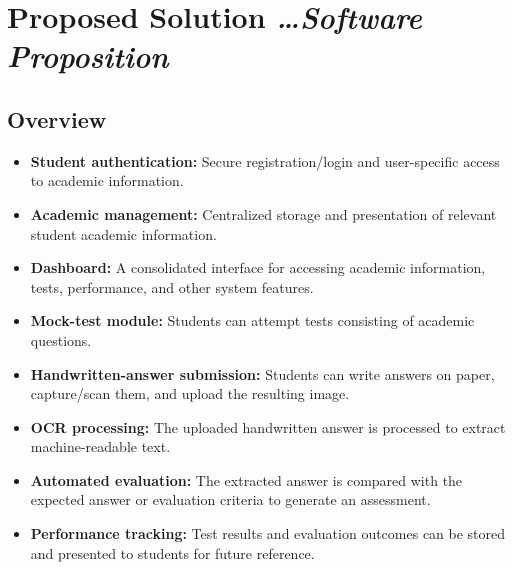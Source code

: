 \documentclass[11pt,a4paper]{article}
\newcommand{\BvrHint}[1]{%
  {\normalfont\normalsize\itshape\hfill #1}}
\begin{document}
\section{Proposed Solution %
\BvrHint{\ldots Software Proposition}}
\subsection{Overview}
\begin{itemize}
    \item \textbf{Student authentication:} Secure registration/login and user-specific access to academic information.

    \item \textbf{Academic management:} Centralized storage and presentation of relevant student academic information.

    \item \textbf{Dashboard:} A consolidated interface for accessing academic information, tests, performance, and other system features.

    \item \textbf{Mock-test module:} Students can attempt tests consisting of academic questions.

    \item \textbf{Handwritten-answer submission:} Students can write answers on paper, capture/scan them, and upload the resulting image.

    \item \textbf{OCR processing:} The uploaded handwritten answer is processed to extract machine-readable text.

    \item \textbf{Automated evaluation:} The extracted answer is compared with the expected answer or evaluation criteria to generate an assessment.

    \item \textbf{Performance tracking:} Test results and evaluation outcomes can be stored and presented to students for future reference.
\end{itemize}
\end{document}
